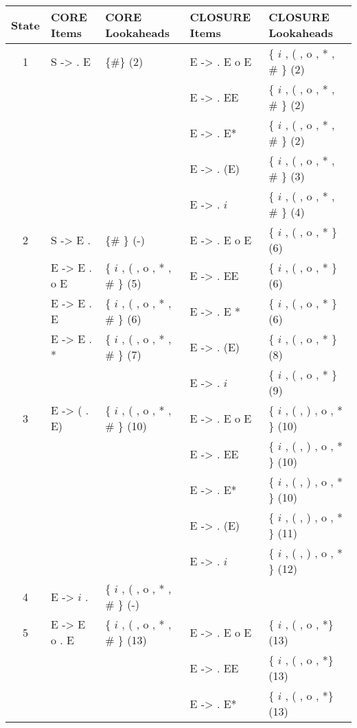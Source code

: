 \begin{center}
    \centering
    \begin{longtable}{c|ll|ll}
\toprule
State & CORE Items   & CORE Lookaheads & CLOSURE Items & CLOSURE Lookaheads\\
\hline
1 &   S ->  . E    & \{\#\} (2)         & E ->  . E o E & \{ $i$ , ( , o , * , \# \} (2)\\
 &              &                & E ->  . EE  & \{ $i$ , ( , o , * , \# \} (2)\\
 &              &                & E ->  . E*  & \{ $i$ , ( , o , * , \# \} (2)\\
 &              &                & E ->  . (E) & \{ $i$ , ( , o , * , \# \} (3)\\
 &              &                & E ->  . $i$   & \{ $i$ , ( , o , * , \# \} (4)\\
\hline
2 &   S -> E .    & \{\#         \} (-) & E ->  . E o E & \{ $i$ , ( , o , * \} (6)\\
 &   E -> E . o E & \{ $i$ , ( , o , * , \# \} (5) & E ->  . EE  & \{ $i$ , ( , o , * \} (6)\\
 &   E -> E . E  & \{ $i$ , ( , o , * , \# \} (6) & E ->  . E *  & \{ $i$ , ( , o , * \} (6)\\
 &   E -> E . *  & \{ $i$ , ( , o , * , \# \} (7) & E ->  . (E) & \{ $i$ , ( , o , * \} (8)\\
 &              &                & E ->  . $i$   & \{ $i$ , ( , o , * \} (9)\\
\hline
3 &   E -> ( . E) & \{ $i$ , ( , o , * , \# \} (10) & E ->  . E o E & \{ $i$ , ( , ) , o , * \} (10)\\
 &              &                & E ->  . EE  & \{ $i$ , ( , ) , o , * \} (10)\\
 &              &                & E ->  . E*  & \{ $i$ , ( , ) , o , * \} (10)\\
 &              &                & E ->  . (E) & \{ $i$ , ( , ) , o , * \} (11)\\
 &              &                & E ->  . $i$   & \{ $i$ , ( , ) , o , * \} (12)\\
\hline
4 &   E -> $i$ .    & \{ $i$ , ( , o , * , \# \} (-)\\
\hline
5 &   E -> E o . E & \{ $i$ , ( , o , * , \# \} (13) & E ->  . E o E & \{ $i$ , ( , o , *\} (13)\\
 &              &                & E ->  . EE  & \{ $i$ , ( , o , *\} (13)\\
 &              &                & E ->  . E*  & \{ $i$ , ( , o , *\} (13)\\

\end{longtable}
\end{center}
